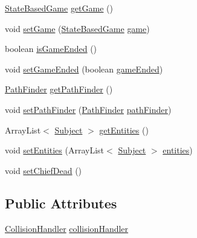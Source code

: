 \begin{DoxyCompactItemize}
\item 
\mbox{\hyperlink{classorg_1_1newdawn_1_1slick_1_1state_1_1_state_based_game}{State\+Based\+Game}} \mbox{\hyperlink{classstates_1_1_game_state_a08a716dc1292aef4744b305312e598f1}{get\+Game}} ()
\item 
void \mbox{\hyperlink{classstates_1_1_game_state_a5da1739500cab675c70888ad75ec458a}{set\+Game}} (\mbox{\hyperlink{classorg_1_1newdawn_1_1slick_1_1state_1_1_state_based_game}{State\+Based\+Game}} \mbox{\hyperlink{classstates_1_1_game_state_a5f563e34a3fc7d777396b68e00b321f5}{game}})
\item 
boolean \mbox{\hyperlink{classstates_1_1_game_state_a30ae5d760e45322b8e77c5959dc992f5}{is\+Game\+Ended}} ()
\item 
void \mbox{\hyperlink{classstates_1_1_game_state_acdafba6555f9ca9a6ce73f2b385d3e9a}{set\+Game\+Ended}} (boolean \mbox{\hyperlink{classstates_1_1_game_state_a67de2baaf7f13d4c875e9b34a54fed5e}{game\+Ended}})
\item 
\mbox{\hyperlink{classentities_1_1_path_finder}{Path\+Finder}} \mbox{\hyperlink{classstates_1_1_game_state_a624f1d82e4bfb86a85f7e624b9010209}{get\+Path\+Finder}} ()
\item 
void \mbox{\hyperlink{classstates_1_1_game_state_a8df71c0f666c07222b9d6314c2ee0c26}{set\+Path\+Finder}} (\mbox{\hyperlink{classentities_1_1_path_finder}{Path\+Finder}} \mbox{\hyperlink{classstates_1_1_game_state_aeaae3c340636293db4737187e847f764}{path\+Finder}})
\item 
Array\+List$<$ \mbox{\hyperlink{classentities_1_1_subject}{Subject}} $>$ \mbox{\hyperlink{classstates_1_1_game_state_ac441d850526544e548921068f5eb78d6}{get\+Entities}} ()
\item 
void \mbox{\hyperlink{classstates_1_1_game_state_a1bc370871445113aae1a9bff43dcc50f}{set\+Entities}} (Array\+List$<$ \mbox{\hyperlink{classentities_1_1_subject}{Subject}} $>$ \mbox{\hyperlink{classstates_1_1_game_state_abb21bb28c6cdc15af651221a524d5073}{entities}})
\item 
void \mbox{\hyperlink{classstates_1_1_game_state_a4429ea297dfd50415f68436e93ee4a43}{set\+Chief\+Dead}} ()
\end{DoxyCompactItemize}
\subsection*{Public Attributes}
\begin{DoxyCompactItemize}
\item 
\mbox{\hyperlink{classentities_1_1_collision_handler}{Collision\+Handler}} \mbox{\hyperlink{classstates_1_1_game_state_a7640e08453b2ce79066278d32d28ab63}{collision\+Handler}}
\end{DoxyCompactItemize}
